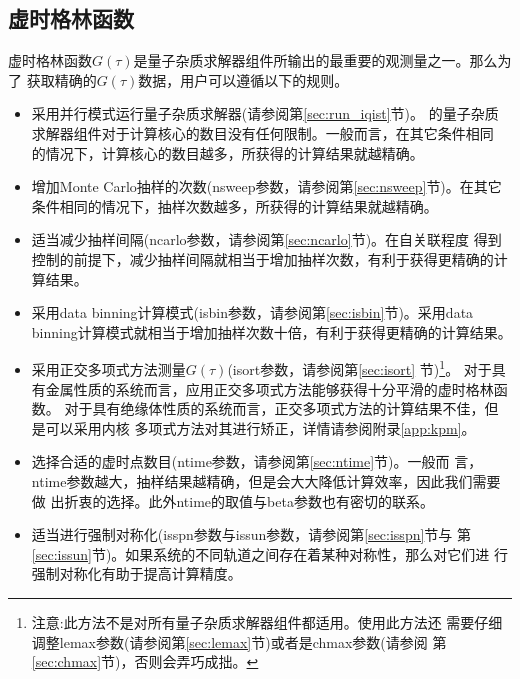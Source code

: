 \subsection{虚时格林函数}
\label{subsec:itime}

虚时格林函数$G(\tau)$是量子杂质求解器组件所输出的最重要的观测量之一。那么为了
获取精确的$G(\tau)$数据，用户可以遵循以下的规则。

\begin{itemize}
\item 采用并行模式运行量子杂质求解器(请参阅第\ref{sec:run_iqist}节)。{\iqist}
的量子杂质求解器组件对于计算核心的数目没有任何限制。一般而言，在其它条件相同
的情况下，计算核心的数目越多，所获得的计算结果就越精确。

\item 增加Monte Carlo抽样的次数(nsweep参数，请参阅第\ref{sec:nsweep}节)。在其它
条件相同的情况下，抽样次数越多，所获得的计算结果就越精确。

\item 适当减少抽样间隔(ncarlo参数，请参阅第\ref{sec:ncarlo}节)。在自关联程度
得到控制的前提下，减少抽样间隔就相当于增加抽样次数，有利于获得更精确的计算结果。

\item 采用data binning计算模式(isbin参数，请参阅第\ref{sec:isbin}节)。采用data
binning计算模式就相当于增加抽样次数十倍，有利于获得更精确的计算结果。

\item 采用正交多项式方法测量$G(\tau)$(isort参数，请参阅第\ref{sec:isort}
节)\footnote{注意:此方法不是对所有量子杂质求解器组件都适用。使用此方法还
需要仔细调整lemax参数(请参阅第\ref{sec:lemax}节)或者是chmax参数(请参阅
第\ref{sec:chmax}节)，否则会弄巧成拙。}。
对于具有金属性质的系统而言，应用正交多项式方法能够获得十分平滑的虚时格林函数。
对于具有绝缘体性质的系统而言，正交多项式方法的计算结果不佳，但是可以采用内核
多项式方法对其进行矫正，详情请参阅附录\ref{app:kpm}。

\item 选择合适的虚时点数目(ntime参数，请参阅第\ref{sec:ntime}节)。一般而
言，ntime参数越大，抽样结果越精确，但是会大大降低计算效率，因此我们需要做
出折衷的选择。此外ntime的取值与beta参数也有密切的联系。

\item 适当进行强制对称化(isspn参数与issun参数，请参阅第\ref{sec:isspn}节与
第\ref{sec:issun}节)。如果系统的不同轨道之间存在着某种对称性，那么对它们进
行强制对称化有助于提高计算精度。

\end{itemize}

